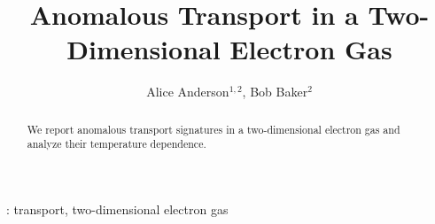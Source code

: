 \title{Anomalous Transport in a Two-Dimensional Electron Gas}
\author{Alice Anderson$^{1,2}$, Bob Baker$^{2}$}
\address{$^{1}$ Department of Physics, University A, City A, Country A}
\address{$^{2}$ National High Field Laboratory, City B, Country B}
\begin{abstract}
We report anomalous transport signatures in a two-dimensional electron gas and analyze their temperature dependence.
\end{abstract}
\vspace{10pt}: transport, two-dimensional electron gas
\maketitle

